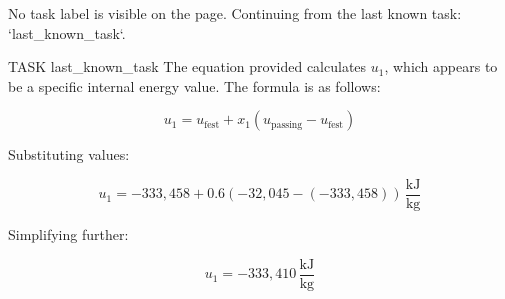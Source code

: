 No task label is visible on the page. Continuing from the last known task: `{last_known_task}`.

TASK {last_known_task}
The equation provided calculates \( u_1 \), which appears to be a specific internal energy value. The formula is as follows:

\[
u_1 = u_{\text{fest}} + x_1 \left( u_{\text{passing}} - u_{\text{fest}} \right)
\]

Substituting values:

\[
u_1 = -333,458 + 0.6 \left( -32,045 - (-333,458) \right) \, \frac{\text{kJ}}{\text{kg}}
\]

Simplifying further:

\[
u_1 = -333,410 \, \frac{\text{kJ}}{\text{kg}}
\]
